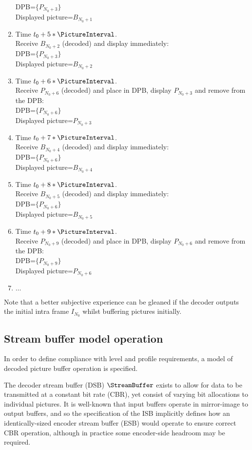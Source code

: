 \begin{informative*}
\begin{enumerate}
DPB=$\{P_{N_0+3}\}$\\
Displayed picture=$B_{N_0+1}$
\item Time $t_0+5*\PictureInterval$. \\
Receive $B_{N_0+2}$ (decoded) and display immediately:\\
DPB=$\{P_{N_0+3}\}$\\
Displayed picture=$B_{N_0+2}$
\item Time $t_0+6*\PictureInterval$. \\
Receive $P_{N_0+6}$ (decoded) and place in DPB, display 
$P_{N_0+3}$ and remove from the DPB:\\
DPB=$\{P_{N_0+6}\}$\\
Displayed picture=$P_{N_0+3}$
\item Time $t_0+7*\PictureInterval$. \\
Receive $B_{N_0+4}$ (decoded) and display immediately:\\
DPB=$\{P_{N_0+6}\}$\\
Displayed picture=$B_{N_0+4}$
\item Time $t_0+8*\PictureInterval$. \\
Receive $B_{N_0+5}$ (decoded) and display immediately:\\
DPB=$\{P_{N_0+6}\}$\\
Displayed picture=$B_{N_0+5}$
\item Time $t_0+9*\PictureInterval$. \\
Receive $P_{N_0+9}$ (decoded) and place in DPB, display 
$P_{N_0+6}$ and remove from the DPB:\\
DPB=$\{P_{N_0+9}\}$\\
Displayed picture=$P_{N_0+6}$
\item $\ldots$
\end{enumerate}

Note that a better subjective experience can be gleaned if the
decoder outputs the initial intra frame $I_{N_0}$ whilst buffering
pictures initially.

\end{informative*}

\subsection{Stream buffer model operation}
\label{streambufferop}

In order to define compliance with level and profile requirements, a model of decoded picture buffer
operation is specified.

The decoder stream buffer (DSB) $\StreamBuffer$ exists to allow for data to be transmitted at a constant bit
rate (CBR), yet consist of varying bit allocations to individual pictures. It is well-known that input buffers
operate in mirror-image to output buffers, and so the specification of the ISB implicitly defines
how an identically-sized encoder stream buffer (ESB) would operate to ensure correct CBR operation, although
in practice some encoder-side headroom may be required.

